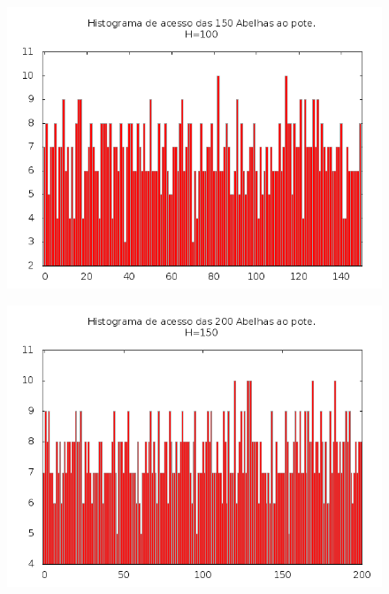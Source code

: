 \documentclass[12pt,a4paper]{article}
\begin{document}
\begin{figure}[!htb]
\centering
\includegraphics[width=0.7\paperwidth]{./graficos/histograma_150_1_100_10_27.png}
\label{Rotulo}
\end{figure}

\begin{figure}[!htb]
\centering
\includegraphics[width=0.7\paperwidth]{./graficos/histograma_200_1_150_29_23.png}
\label{Rotulo}
\end{figure}
\end{document}

